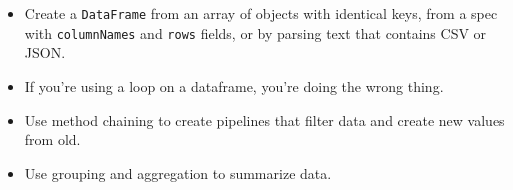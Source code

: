 \begin{itemize}
\item
  Create a \texttt{DataFrame} from an array of objects with identical keys,
  from a spec with \texttt{columnNames} and \texttt{rows} fields,
  or by parsing text that contains CSV or JSON.

\item
  If you're using a loop on a dataframe,
  you're doing the wrong thing.

\item
  Use method chaining to create pipelines
  that filter data and create new values from old.

\item
  Use grouping and aggregation to summarize data.
\end{itemize}
